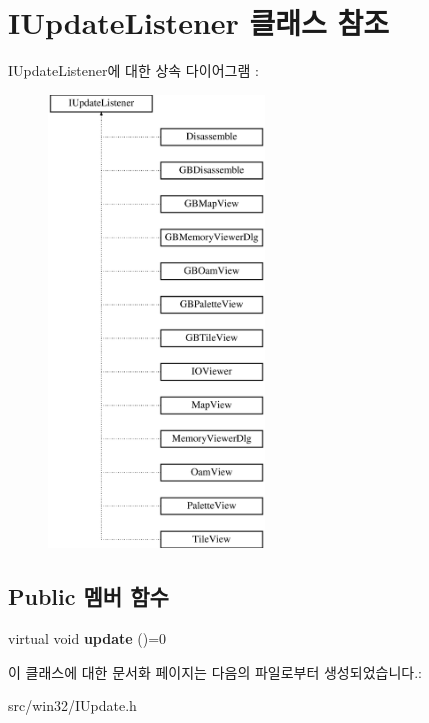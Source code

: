 \hypertarget{class_i_update_listener}{}\section{I\+Update\+Listener 클래스 참조}
\label{class_i_update_listener}
I\+Update\+Listener에 대한 상속 다이어그램 \+: \begin{figure}[H]
\begin{center}
\leavevmode
\includegraphics[height=12.000000cm]{class_i_update_listener}
\end{center}
\end{figure}
\subsection*{Public 멤버 함수}
\begin{DoxyCompactItemize}
\item 
\mbox{\label{class_i_update_listener_ac03b85f52e858d0bbd08a4984b2cb929}} 
virtual void {\bfseries update} ()=0
\end{DoxyCompactItemize}


이 클래스에 대한 문서화 페이지는 다음의 파일로부터 생성되었습니다.\+:\begin{DoxyCompactItemize}
\item 
src/win32/I\+Update.\+h\end{DoxyCompactItemize}
